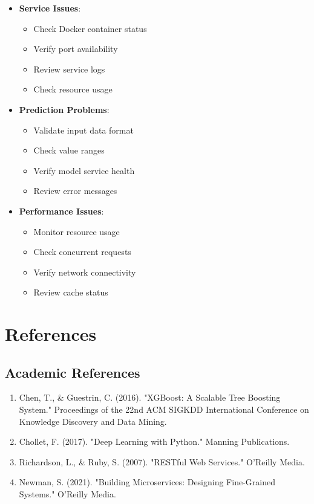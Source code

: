 \documentclass[12pt,a4paper]{report}
\begin{document}
\begin{itemize}
    \item \textbf{Service Issues}:
    \begin{itemize}
        \item Check Docker container status
        \item Verify port availability
        \item Review service logs
        \item Check resource usage
    \end{itemize}
    
    \item \textbf{Prediction Problems}:
    \begin{itemize}
        \item Validate input data format
        \item Check value ranges
        \item Verify model service health
        \item Review error messages
    \end{itemize}
    
    \item \textbf{Performance Issues}:
    \begin{itemize}
        \item Monitor resource usage
        \item Check concurrent requests
        \item Verify network connectivity
        \item Review cache status
    \end{itemize}
\end{itemize}
\chapter{References}

\section{Academic References}
\begin{enumerate}
    \item Chen, T., \& Guestrin, C. (2016). "XGBoost: A Scalable Tree Boosting System." Proceedings of the 22nd ACM SIGKDD International Conference on Knowledge Discovery and Data Mining.
    
    \item Chollet, F. (2017). "Deep Learning with Python." Manning Publications.
    
    \item Richardson, L., \& Ruby, S. (2007). "RESTful Web Services." O'Reilly Media.
    
    \item Newman, S. (2021). "Building Microservices: Designing Fine-Grained Systems." O'Reilly Media.
\end{enumerate}
\end{document}
